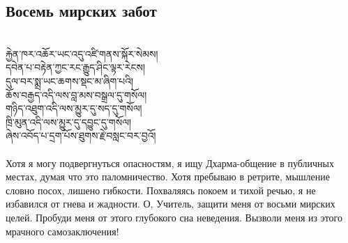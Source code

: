 \subsection*{Восемь мирских забот}
\\
\ti
རྐྱེན་ཁར་འཆོར་ཡང་འདུ་འཛི་གནས་སྐོར་སེམས།\\
དབེན་པ་བརྟེན་ཀྱང་རང་རྒྱུད་ཤིང་ལྟར་རེངས། \\
དུལ་བར་སྨྲ་ཡང་ཆགས་སྡང་མ་ཞིག་པའི། \\
ཆོས་བརྒྱད་འདི་ལས་བླ་མས་བསྒྲལ་དུ་གསོལ། \\
གཉིད་འཐུག་འདི་ལས་མྱུར་དུ་སད་དུ་གསོལ། \\
ཁྲི་མུན་འདི་ལས་མྱུར་དུ་དབྱུང་དུ་གསོལ། \\
ཞེས་འབོད་པ་དྲག་པོས་ཐུགས་རྗེ་བསླང་བར་བྱའོ།\\
\\
\ru
Хотя я могу подвергнуться опасностям, я ищу Дхарма-общение
в публичных местах, думая что это паломничество.
Хотя пребы\-ваю в ретрите, мышление словно посох, лишено гибкости.
По\-хваляясь покоем и тихой речью, я не избавился от гнева и жадности.
О, Учитель, защити меня от восьми мирских целей.
Пробуди меня от этого глубокого сна неведения.
Вызволи меня из этого мрачного самозаключения!

